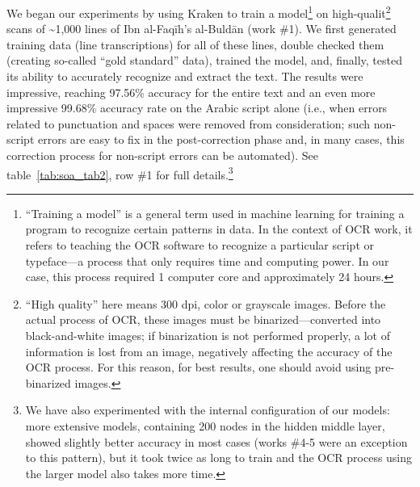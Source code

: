 We began our experiments by using Kraken to train a model\footnote{“Training a
model” is a general term used in machine learning for training a program to
recognize certain patterns in data. In the context of OCR work, it refers to
teaching the OCR software to recognize a particular script or typeface—a
process that only requires time and computing power. In our case, this process
required 1 computer core and approximately 24 hours.} on
high-qualit\footnote{“High quality” here means 300 dpi, color or grayscale
images. Before the actual process of OCR, these images must be
binarized—converted into black-and-white images; if binarization is not
performed properly, a lot of information is lost from an image, negatively
affecting the accuracy of the OCR process. For this reason, for best results,
one should avoid using pre-binarized images.} scans of \textasciitilde1,000 lines of
Ibn al-Faqīh’s al-Buldān (work \#1). We first generated training data (line
transcriptions) for all of these lines, double checked them (creating so-called
“gold standard” data), trained the model, and, finally,
tested its ability to accurately recognize and extract the text. The results
were impressive, reaching 97.56\% accuracy for the entire text and an even more
impressive 99.68\% accuracy rate on the Arabic script alone (i.e., when errors
related to punctuation and spaces were removed from consideration; such
non-script errors are easy to fix in the post-correction phase and, in many
cases, this correction process for non-script errors can be automated). See
table~\ref{tab:soa_tab2}, row \#1 for full details.\footnote{We have also experimented with the
internal configuration of our models: more extensive models, containing 200
nodes in the hidden middle layer, showed slightly better accuracy in most cases
(works \#4-5 were an exception to this pattern), but it took twice as long to
train and the OCR process using the larger model also takes more time.}

